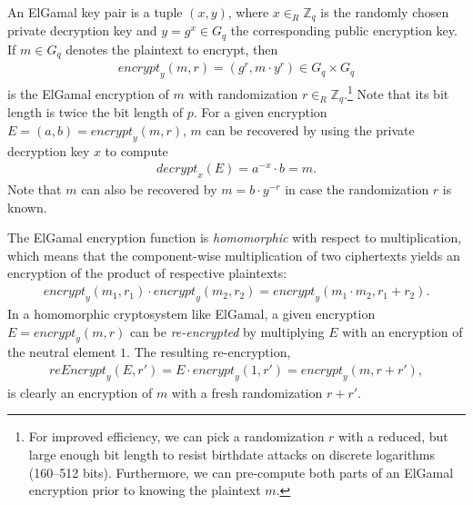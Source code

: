 \documentclass[bibtotoc,halfparskip,oneside]{scrreprt}
\begin{document}
	An ElGamal key pair is a tuple $(x,y)$, where $x\in_R\mathbb{Z}_q$ is the randomly chosen private decryption key and $y=g^x\in G_q$ the corresponding public encryption key. If $m\in G_q$ denotes the plaintext to encrypt, then 
	\begin{align}
		\mathit{encrypt}_y(m,r)=(g^r,m\cdot y^r)\in G_q\times G_q
	\end{align} 
	is the ElGamal encryption of $m$ with randomization $r \in_R\mathbb{Z}_q$.\footnote{For improved efficiency, we can pick a randomization $r$ with a reduced, but large enough bit length to resist birthdate attacks on discrete logarithms (160--512 bits). Furthermore, we can pre-compute both parts of an ElGamal encryption prior to knowing the plaintext $m$.} Note that its bit length is twice the bit length of $p$. For a given encryption $E=(a,b)=\mathit{encrypt}_y(m,r)$, $m$ can be recovered by using the private decryption key $x$ to compute 
	\begin{align}
		\mathit{decrypt}_x(E)=a^{-x}\cdot b = m.
	\end{align} 
	Note that $m$ can also be recovered by $m=b\cdot y^{-r}$ in case the randomization $r$ is known. 
	
	The ElGamal encryption function is \emph{homomorphic} with respect to multiplication, which means that the component-wise multiplication of two ciphertexts yields an encryption of the product of respective plaintexts:
	\begin{align}
		\mathit{encrypt}_y(m_1,r_1)\cdot\mathit{encrypt}_y(m_2,r_2)=\mathit{encrypt}_y(m_1\cdot m_2,r_1+r_2).
	\end{align}
	In a homomorphic cryptosystem like ElGamal, a given encryption $E=\mathit{encrypt}_y(m,r)$ can be \emph{re-encrypted} by multiplying $E$ with an encryption of the neutral element $1$. The resulting re-encryption, 
	\begin{align}
		\mathit{reEncrypt}_y(E,r')=E\cdot\mathit{encrypt}_y(1,r')=\mathit{encrypt}_y(m,r+r'),
	\end{align}
	is clearly an encryption of $m$ with a fresh randomization $r+r'$.
	
\end{document}

